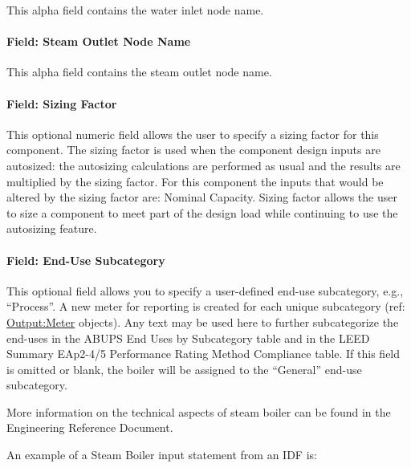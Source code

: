 This alpha field contains the water inlet node name.

\paragraph{Field: Steam Outlet Node Name}\label{field-steam-outlet-node-name}

This alpha field contains the steam outlet node name.

\paragraph{Field: Sizing Factor}\label{field-sizing-factor-11}

This optional numeric field allows the user to specify a sizing factor for this component. The sizing factor is used when the component design inputs are autosized: the autosizing calculations are performed as usual and the results are multiplied by the sizing factor. For this component the inputs that would be altered by the sizing factor are: Nominal Capacity. Sizing factor allows the user to size a component to meet part of the design load while continuing to use the autosizing feature.

\paragraph{Field: End-Use Subcategory}\label{end-use-subcategory-11}

This optional field allows you to specify a user-defined end-use subcategory, e.g., ``Process''. A new meter for reporting is created for each unique subcategory (ref: \hyperref[outputmeter-and-outputmetermeterfileonly]{Output:Meter} objects). Any text may be used here to further subcategorize the end-uses in the ABUPS End Uses by Subcategory table and in the LEED Summary EAp2-4/5 Performance Rating Method Compliance table. If this field is omitted or blank, the boiler will be assigned to the ``General'' end-use subcategory.


More information on the technical aspects of steam boiler can be found in the Engineering Reference Document.

An example of a Steam Boiler input statement from an IDF is:

